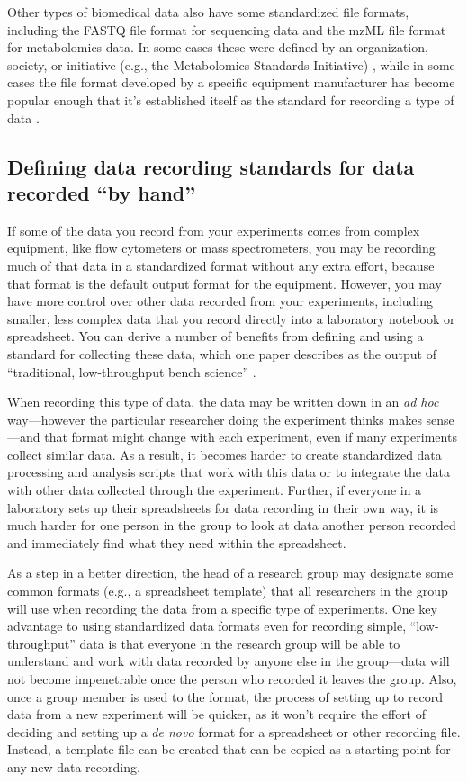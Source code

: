 \documentclass[]{tufte-book}
\begin{document}
Other types of biomedical data also have some standardized file formats,
including the FASTQ file format for sequencing data and the mzML file format for
metabolomics data. In some cases these were defined by an organization, society,
or initiative (e.g., the Metabolomics Standards Initiative)
\citep{ghosh2011software}, while in some cases the file format developed by a
specific equipment manufacturer has become popular enough that it's established
itself as the standard for recording a type of data \citep{brazma2006standards}.

\subsection{Defining data recording standards for data recorded ``by hand''}\label{defining-data-recording-standards-for-data-recorded-by-hand}

If some of the data you record from your experiments comes from complex
equipment, like flow cytometers or mass spectrometers, you may be recording much
of that data in a standardized format without any extra effort, because that
format is the default output format for the equipment. However, you may have
more control over other data recorded from your experiments, including smaller,
less complex data that you record directly into a laboratory notebook or
spreadsheet. You can derive a number of benefits from defining and using a
standard for collecting these data, which one paper describes as
the output of ``traditional, low-throughput bench science'' \citep{wilkinson2016fair}.

When recording this type of data, the data may be written down in an \emph{ad hoc}
way---however the particular researcher doing the experiment thinks makes
sense---and that format might change with each experiment, even if many
experiments collect similar data. As a result, it becomes harder to create
standardized data processing and analysis scripts that work with this data or to
integrate the data with other data collected through the experiment. Further, if
everyone in a laboratory sets up their spreadsheets for data recording in their
own way, it is much harder for one person in the group to look at data another
person recorded and immediately find what they need within the spreadsheet.

As a step in a better direction, the head of a research group may designate some
common formats (e.g., a spreadsheet template) that all researchers in the group
will use when recording the data from a specific type of experiments. One key
advantage to using standardized data formats even for recording simple,
``low-throughput'' data is that everyone in the research group will be able to
understand and work with data recorded by anyone else in the group---data will
not become impenetrable once the person who recorded it leaves the group. Also,
once a group member is used to the format, the process of setting up to record
data from a new experiment will be quicker, as it won't require the effort of
deciding and setting up a \emph{de novo} format for a spreadsheet or other recording
file. Instead, a template file can be created that can be copied as a starting
point for any new data recording.
\end{document}
